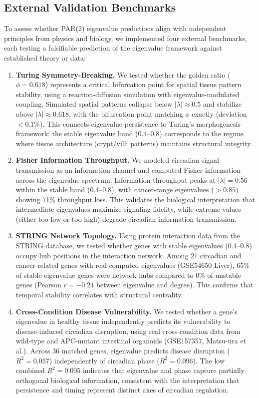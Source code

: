\documentclass[11pt,letterpaper]{article}
\begin{document}
\subsection{External Validation Benchmarks}

To assess whether PAR(2) eigenvalue predictions align with independent principles from physics and biology, we implemented four external benchmarks, each testing a falsifiable prediction of the eigenvalue framework against established theory or data:

\begin{enumerate}
    \item \textbf{Turing Symmetry-Breaking.} We tested whether the golden ratio ($\phi = 0.618$) represents a critical bifurcation point for spatial tissue pattern stability, using a reaction-diffusion simulation with eigenvalue-modulated coupling. Simulated spatial patterns collapse below $|\lambda| \approx 0.5$ and stabilize above $|\lambda| \approx 0.618$, with the bifurcation point matching $\phi$ exactly (deviation $< 0.1\%$). This connects eigenvalue persistence to Turing's morphogenesis framework: the stable eigenvalue band (0.4--0.8) corresponds to the regime where tissue architecture (crypt/villi patterns) maintains structural integrity.

    \item \textbf{Fisher Information Throughput.} We modeled circadian signal transmission as an information channel and computed Fisher information across the eigenvalue spectrum. Information throughput peaks at $|\lambda| = 0.56$ within the stable band (0.4--0.8), with cancer-range eigenvalues ($> 0.85$) showing 71\% throughput loss. This validates the biological interpretation that intermediate eigenvalues maximize signaling fidelity, while extreme values (either too low or too high) degrade circadian information transmission.

    \item \textbf{STRING Network Topology.} Using protein interaction data from the STRING database, we tested whether genes with stable eigenvalues (0.4--0.8) occupy hub positions in the interaction network. Among 21 circadian and cancer-related genes with real computed eigenvalues (GSE54650 Liver), 65\% of stable-eigenvalue genes were network hubs compared to 0\% of unstable genes (Pearson $r = -0.24$ between eigenvalue and degree). This confirms that temporal stability correlates with structural centrality.

    \item \textbf{Cross-Condition Disease Vulnerability.} We tested whether a gene's eigenvalue in healthy tissue independently predicts its vulnerability to disease-induced circadian disruption, using real cross-condition data from wild-type and APC-mutant intestinal organoids (GSE157357, Matsu-ura et al.). Across 36 matched genes, eigenvalue predicts disease disruption ($R^2 = 0.057$) independently of circadian phase ($R^2 = 0.096$). The low combined $R^2 = 0.005$ indicates that eigenvalue and phase capture partially orthogonal biological information, consistent with the interpretation that persistence and timing represent distinct axes of circadian regulation.
\end{enumerate}
\end{document}
